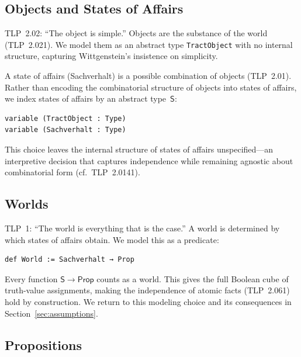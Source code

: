 \documentclass[10pt, letterpaper]{article}
\theoremstyle{definition}
\theoremstyle{remark}
\newcommand{\Sach}{\mathsf{S}}
\newcommand{\Prop}{\mathsf{Prop}}
\begin{document}
\subsection{Objects and States of Affairs}
\label{sec:objects}

TLP~2.02: ``The object is simple.''  Objects are the substance
of the world (TLP~2.021).  We model them as an abstract type
\texttt{TractObject} with no internal structure, capturing
Wittgenstein's insistence on simplicity.

A state of affairs (Sachverhalt) is a possible combination of
objects (TLP~2.01).  Rather than encoding the combinatorial
structure of objects into states of affairs, we index states of
affairs by an abstract type~$\Sach$:

\begin{lstlisting}
variable (TractObject : Type)
variable (Sachverhalt : Type)
\end{lstlisting}

\noindent
This choice leaves the internal structure of states of affairs
unspecified---an interpretive decision that captures independence
while remaining agnostic about combinatorial form (cf.\
TLP~2.0141).

\subsection{Worlds}
\label{sec:worlds}

TLP~1: ``The world is everything that is the case.''
A world is determined by which states of affairs obtain.  We
model this as a predicate:

\begin{lstlisting}
def World := Sachverhalt → Prop
\end{lstlisting}

\noindent
Every function $\Sach \to \Prop$ counts as a world.  This gives
the full Boolean cube of truth-value assignments, making the
independence of atomic facts (TLP~2.061) hold by construction.
We return to this modeling choice and its consequences in
Section~\ref{sec:assumptions}.

\subsection{Propositions}
\label{sec:propositions}
\end{document}
